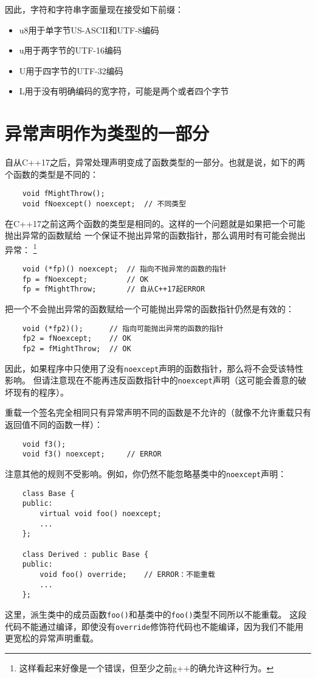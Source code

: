 因此，字符和字符串字面量现在接受如下前缀：
\begin{itemize}
    \item u8用于单字节US-ASCII和UTF-8编码
    \item u用于两字节的UTF-16编码
    \item U用于四字节的UTF-32编码
    \item L用于没有明确编码的宽字符，可能是两个或者四个字节
\end{itemize}

\section{异常声明作为类型的一部分}\label{ch8.7}
自从C++17之后，异常处理声明变成了函数类型的一部分。也就是说，如下的两个函数的类型是不同的：
\begin{lstlisting}
    void fMightThrow();
    void fNoexcept() noexcept;  // 不同类型
\end{lstlisting}
在C++17之前这两个函数的类型是相同的。这样的一个问题就是如果把一个可能抛出异常的函数赋给
一个保证不抛出异常的函数指针，那么调用时有可能会抛出异常：
\footnote{这样看起来好像是一个错误，但至少之前g++的确允许这种行为。}
\begin{lstlisting}
    void (*fp)() noexcept;  // 指向不抛异常的函数的指针
    fp = fNoexcept;         // OK
    fp = fMightThrow;       // 自从C++17起ERROR
\end{lstlisting}
把一个不会抛出异常的函数赋给一个可能抛出异常的函数指针仍然是有效的：
\begin{lstlisting}
    void (*fp2)();      // 指向可能抛出异常的函数的指针
    fp2 = fNoexcept;    // OK
    fp2 = fMightThrow;  // OK
\end{lstlisting}
因此，如果程序中只使用了没有\texttt{noexcept}声明的函数指针，那么将不会受该特性影响。
但请注意现在不能再违反函数指针中的\texttt{noexcept}声明（这可能会善意的破坏现有的程序）。

重载一个签名完全相同只有异常声明不同的函数是不允许的（就像不允许重载只有返回值不同的函数一样）：
\begin{lstlisting}
    void f3();
    void f3() noexcept;     // ERROR
\end{lstlisting}
注意其他的规则不受影响。例如，你仍然不能忽略基类中的\texttt{noexcept}声明：
\begin{lstlisting}
    class Base {
    public:
        virtual void foo() noexcept;
        ...
    };

    class Derived : public Base {
    public:
        void foo() override;    // ERROR：不能重载
        ...
    };
\end{lstlisting}
这里，派生类中的成员函数\texttt{foo()}和基类中的\texttt{foo()}类型不同所以不能重载。
这段代码不能通过编译，即使没有\texttt{override}修饰符代码也不能编译，因为我们不能用
更宽松的异常声明重载。

